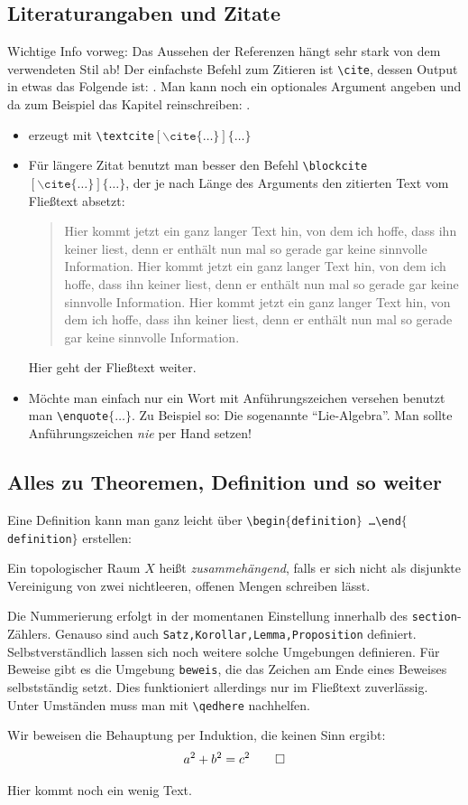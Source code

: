 \subsection{Literaturangaben und Zitate} %
Wichtige Info vorweg: Das Aussehen der Referenzen hängt sehr stark von dem verwendeten Stil ab! Der einfachste Befehl zum Zitieren ist 
\texttt{\textbackslash{}cite}, dessen Output in etwas das Folgende ist: \cite{CGL}. Man kann noch ein optionales Argument angeben und da zum Beispiel das Kapitel reinschreiben: \cite[Kapitel $\pi$]{CGL}.
\begin{itemize}
	\item {} erzeugt mit \texttt{\textbackslash{}textcite$[\backslash\texttt{cite}\{\ldots\}]\{\ldots\}$}
	\item Für längere Zitat benutzt man besser den Befehl \texttt{\textbackslash{}blockcite$[\backslash\texttt{cite}\{\ldots\}]\{\ldots\}$}, der je nach 
	Länge des Arguments den zitierten Text vom Fließtext absetzt: \blockquote[\cite{CGL}]{Hier kommt jetzt ein ganz langer Text hin, von dem ich hoffe, 
	dass ihn keiner liest, denn er enthält nun mal so gerade gar keine sinnvolle Information. Hier kommt jetzt ein ganz langer Text hin, von dem ich hoffe, 
	dass ihn keiner liest, denn er enthält nun mal so gerade gar keine sinnvolle Information. Hier kommt jetzt ein ganz langer Text hin, von dem ich hoffe, 
	dass ihn keiner liest, denn er enthält nun mal so gerade gar keine sinnvolle Information.}
	Hier geht der Fließtext weiter.
	\item Möchte man einfach nur ein Wort mit Anführungszeichen versehen benutzt man \texttt{\textbackslash{}enquote$\{\ldots \}$}. Zu Beispiel so:
	Die sogenannte \enquote{Lie-Algebra}. Man sollte Anführungszeichen \emph{nie} per Hand setzen!
\end{itemize}

\subsection{Alles zu Theoremen, Definition und so weiter} %
Eine Definition kann man ganz leicht über \texttt{\textbackslash{}begin$\{$definition$\}$ \ldots \textbackslash{}end$\{$definition$\}$} erstellen:
\begin{definition}
Ein topologischer Raum $X$ heißt \emph{zusammehängend}, falls er sich nicht als disjunkte Vereinigung von zwei nichtleeren, offenen Mengen schreiben lässt.
\end{definition}
Die Nummerierung erfolgt in der momentanen Einstellung innerhalb des \texttt{section}-Zählers. Genauso sind auch \texttt{Satz,Korollar,Lemma,Proposition} definiert. 
Selbstverständlich lassen sich noch weitere solche Umgebungen definieren. Für Beweise gibt es die Umgebung \texttt{beweis}, die das Zeichen am Ende eines Beweises selbstständig setzt. Dies funktioniert allerdings nur im Fließtext zuverlässig. Unter Umständen muss man mit \texttt{\textbackslash{}qedhere} nachhelfen.
\begin{beweis}
Wir beweisen die Behauptung per Induktion, die keinen Sinn ergibt:
\[
	a^2+b^2=c^2 \qedhere
\]
\end{beweis}
\newpage

Hier kommt noch ein wenig Text.

\appendix %
\printbibliography

